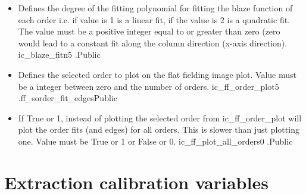 \begin{itemize}
\item {}
{Defines the degree of the fitting polynomial for fitting the blaze function of each order i.e. if value is 1 is a linear fit, if the value is 2 is a quadratic fit. The value must be a positive integer equal to or greater than zero (zero would lead to a constant fit along the column direction (x-axis direction).}
{ic\_blaze\_fitn}{5}
{\calFFraw}{\constantsfile}{\calFFraw.\progMAIN}{Public}


\item {}
{Defines the selected order to plot on the flat fielding image plot. Value must be a integer between zero and the number of orders.}
{ic\_ff\_order\_plot}{5}
{\calFFraw}{\constantsfile}{\spirouPlot.ff\_sorder\_fit\_edges}{Public}

\item {}
{If True or 1, instead of plotting the selected order from ic\_ff\_order\_plot will plot the order fits (and edges) for all orders. This is slower than just plotting one. Value must be True or 1 or False or 0.}
{ic\_ff\_plot\_all\_orders}{0}
{\calFFraw}{\constantsfile}{\calFFraw.\progMAIN}{Public}

\end{itemize}








\clearpage
\newpage
\section{Extraction calibration variables}
\label{ch:variables:extraction}

